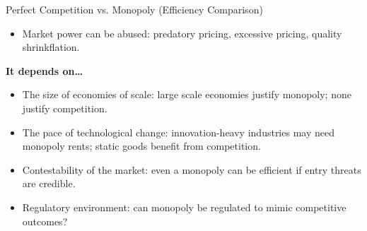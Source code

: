 \documentclass[11pt, a4paper, twoside]{book}
\begin{document}
\begin{evaluation}{Perfect Competition vs. Monopoly (Efficiency Comparison)}
\begin{itemize}[leftmargin=*, nosep]
\item Market power can be abused: predatory pricing, excessive pricing, quality shrinkflation.
\end{itemize}
\textbf{It depends on\ldots}
\begin{itemize}[leftmargin=*, nosep]
\item The size of economies of scale: large scale economies justify monopoly; none justify competition.
\item The pace of technological change: innovation-heavy industries may need monopoly rents; static goods benefit from competition.
\item Contestability of the market: even a monopoly can be efficient if entry threats are credible.
\item Regulatory environment: can monopoly be regulated to mimic competitive outcomes?
\end{itemize}
\end{evaluation}
\end{document}
